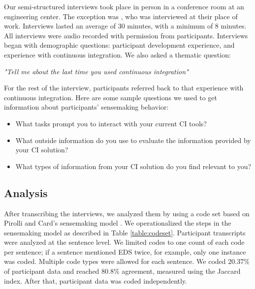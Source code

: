 \documentclass{sig-alternate}
\begin{document}
Our semi-structured interviews took place in person in a conference room at an engineering center. The exception was \cpg, who was interviewed at their place of work. Interviews lasted an average of 30 minutes, with a minimum of 8 minutes. All interviews were audio recorded with permission from participants.  Interviews began with demographic questions: participant development experience, and experience with continuous integration. We also asked a thematic question:

\smallskip
\textit{"Tell me about the last time you used continuous integration"}


For the rest of the interview, participants referred back to that experience with continuous integration. Here are some sample questions we used to get information about participants' sensemaking behavior:
\begin{itemize}  
	\item What tasks prompt you to interact with your current CI tools?
	\item What outside information do you use to evaluate the information provided by your CI solution?
	\item What types of information from your CI solution do you find relevant to you? 
\end{itemize}

\subsection{Analysis}
After transcribing the interviews, we analyzed them by using a code set based on Pirolli and Card's sensemaking model \cite{pirolli:sensemaking}. We operationalized the steps in the sensemaking model as described in Table \ref{table:codeset}. Participant transcripts were analyzed at the sentence level. We limited codes to one count of each code per sentence; if a sentence mentioned EDS twice, for example, only one instance was coded. Multiple code types were allowed for each sentence. We coded 20.37\% of participant data and reached 80.8\% agreement, measured using the Jaccard index. After that, participant data was coded independently.
\end{document}
